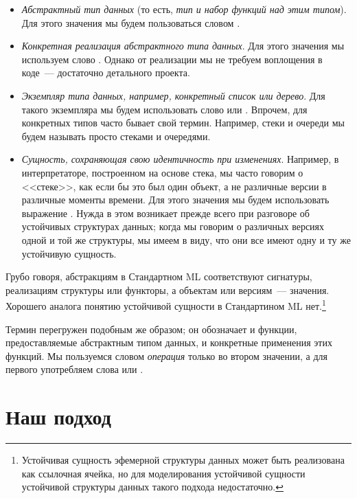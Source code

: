 \begin{itemize}
\item \emph{Абстрактный тип данных} (то есть,
  \emph{тип и набор функций над этим типом}). Для этого значения мы
  будем пользоваться словом .
\item \emph{Конкретная реализация абстрактного типа данных}. Для этого
  значения мы используем слово
  . Однако от реализации мы не требуем
  воплощения в коде~--- достаточно детального проекта.
\item \emph{Экземпляр типа данных, например, конкретный список или
    дерево}. Для такого экземпляра мы будем использовать слово
   или . Впрочем,
  для конкретных типов часто бывает свой термин. Например, стеки и
  очереди мы будем называть просто стеками и очередями.
\item \emph{Сущность, сохраняющая свою идентичность при
    изменениях}. Например, в интерпретаторе, построенном на основе
  стека, мы часто говорим о <<стеке>>, как если бы это был один
  объект, а не различные версии в различные моменты времени. Для этого
  значения мы будем использовать выражение .  Нужда в этом возникает прежде
  всего при разговоре об устойчивых структурах данных; когда мы
  говорим о различных версиях одной и той же структуры, мы имеем в
  виду, что они все имеют одну и ту же устойчивую сущность.
\end{itemize}
Грубо говоря, абстракциям в Стандартном ML соответствуют сигнатуры,
реализациям структуры или функторы, а объектам или версиям~---
значения. Хорошего аналога понятию устойчивой сущности в Стандартином
ML нет.\footnote{%
  Устойчивая сущность эфемерной структуры данных может быть
  реализована как ссылочная ячейка, но для моделирования устойчивой
  сущности устойчивой структуры данных такого подхода недостаточно.
}

Термин  перегружен подобным же образом; он
обозначает и функции, предоставляемые абстрактным типом данных, и
конкретные применения этих функций. Мы пользуемся словом
\emph{операция} только во втором значении, а для первого употребляем
слова  или .

\section{Наш подход}

